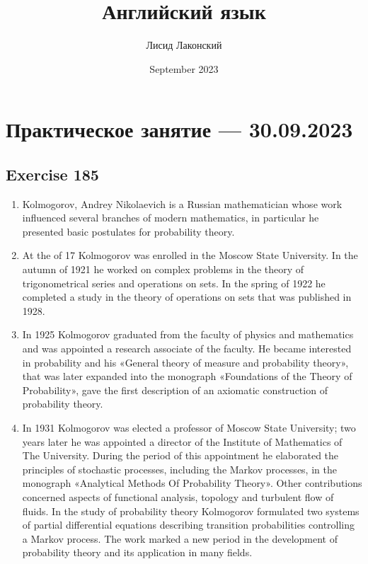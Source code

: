\documentclass{article}
\title{Английский язык}
\author{Лисид Лаконский}
\date{September 2023}
\begin{document}
\raggedright

\maketitle

\tableofcontents
\pagebreak

\section{Практическое занятие — 30.09.2023}

\subsection{Exercise 185}

\begin{enumerate}
    \item Kolmogorov, Andrey Nikolaevich is a Russian mathematician whose work influenced several branches of modern mathematics, in particular he presented basic postulates for probability theory.  
    \item At the of 17 Kolmogorov was enrolled in the Moscow State University. In the autumn of 1921 he worked on complex problems in the theory of trigonometrical series and operations on sets. In the spring of 1922 he completed a study in the theory of operations on sets that was published in 1928.
    \item In 1925 Kolmogorov graduated from the faculty of physics and mathematics and was appointed a research associate of the faculty. He became interested in probability and his «General theory of measure and probability theory», that was later expanded into the monograph «Foundations of the Theory of Probability», gave the first description of an axiomatic construction of probability theory.
    \item In 1931 Kolmogorov was elected a professor of Moscow State University; two years later he was appointed a director of the Institute of Mathematics of The University. During the period of this appointment he elaborated the principles of stochastic processes, including the Markov processes, in the monograph «Analytical Methods Of Probability Theory». Other contributions concerned aspects of functional analysis, topology and turbulent flow of fluids. In the study of probability theory Kolmogorov formulated two systems of partial differential equations describing transition probabilities controlling a Markov process. The work marked a new period in the development of probability theory and its application in many fields.
\end{enumerate}
\end{document}
